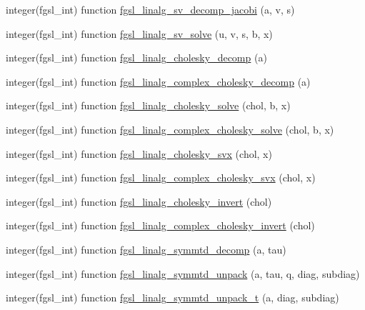 \begin{DoxyCompactItemize}
\item 
integer(fgsl\-\_\-int) function \hyperlink{linalg_8finc_a523fe136a01c78b49531b7e0156b97b6}{fgsl\-\_\-linalg\-\_\-sv\-\_\-decomp\-\_\-jacobi} (a, v, s)
\item 
integer(fgsl\-\_\-int) function \hyperlink{linalg_8finc_a6d96a619a57aeb6a8713babe93a9b71b}{fgsl\-\_\-linalg\-\_\-sv\-\_\-solve} (u, v, s, b, x)
\item 
integer(fgsl\-\_\-int) function \hyperlink{linalg_8finc_aa2fa70a59c49090e137f5df8c8c0100f}{fgsl\-\_\-linalg\-\_\-cholesky\-\_\-decomp} (a)
\item 
integer(fgsl\-\_\-int) function \hyperlink{linalg_8finc_a8f9547ecd2fa79bcf02e423c078bb4ea}{fgsl\-\_\-linalg\-\_\-complex\-\_\-cholesky\-\_\-decomp} (a)
\item 
integer(fgsl\-\_\-int) function \hyperlink{linalg_8finc_a7bca2d4f11f9e651c747926af5a5be70}{fgsl\-\_\-linalg\-\_\-cholesky\-\_\-solve} (chol, b, x)
\item 
integer(fgsl\-\_\-int) function \hyperlink{linalg_8finc_a7ff644dd25158aa5e839ccbc63a5d323}{fgsl\-\_\-linalg\-\_\-complex\-\_\-cholesky\-\_\-solve} (chol, b, x)
\item 
integer(fgsl\-\_\-int) function \hyperlink{linalg_8finc_ac949d4b315b2803bf6d98a3b1549321a}{fgsl\-\_\-linalg\-\_\-cholesky\-\_\-svx} (chol, x)
\item 
integer(fgsl\-\_\-int) function \hyperlink{linalg_8finc_a20424291c37db28845ad5b97cbefb32d}{fgsl\-\_\-linalg\-\_\-complex\-\_\-cholesky\-\_\-svx} (chol, x)
\item 
integer(fgsl\-\_\-int) function \hyperlink{linalg_8finc_a0613e58907c2ae3d3527bc6d76db20f9}{fgsl\-\_\-linalg\-\_\-cholesky\-\_\-invert} (chol)
\item 
integer(fgsl\-\_\-int) function \hyperlink{linalg_8finc_ab986997d7b43b9df1c81a62c0117d3da}{fgsl\-\_\-linalg\-\_\-complex\-\_\-cholesky\-\_\-invert} (chol)
\item 
integer(fgsl\-\_\-int) function \hyperlink{linalg_8finc_a529a24d383e0ed224830a3b5a45329b4}{fgsl\-\_\-linalg\-\_\-symmtd\-\_\-decomp} (a, tau)
\item 
integer(fgsl\-\_\-int) function \hyperlink{linalg_8finc_a43c68814765ca38dd4054712c4dde774}{fgsl\-\_\-linalg\-\_\-symmtd\-\_\-unpack} (a, tau, q, diag, subdiag)
\item 
integer(fgsl\-\_\-int) function \hyperlink{linalg_8finc_a4d487701aea9f427ae6482afc63567ee}{fgsl\-\_\-linalg\-\_\-symmtd\-\_\-unpack\-\_\-t} (a, diag, subdiag)
\item 

\end{DoxyCompactItemize}
